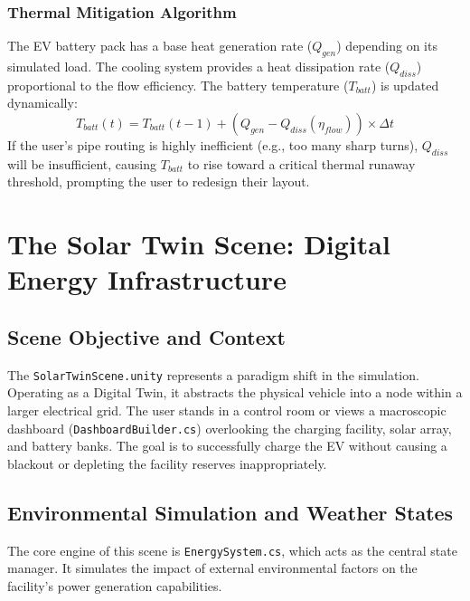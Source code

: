 \documentclass[12pt,a4paper,oneside]{report}
\begin{document}
\subsection{Thermal Mitigation Algorithm}
The EV battery pack has a base heat generation rate ($Q_{gen}$) depending on its simulated load. The cooling system provides a heat dissipation rate ($Q_{diss}$) proportional to the flow efficiency. 
The battery temperature ($T_{batt}$) is updated dynamically:
\begin{equation}
    T_{batt}(t) = T_{batt}(t-1) + \left( Q_{gen} - Q_{diss}(\eta_{flow}) \right) \times \Delta t
\end{equation}
If the user's pipe routing is highly inefficient (e.g., too many sharp turns), $Q_{diss}$ will be insufficient, causing $T_{batt}$ to rise toward a critical thermal runaway threshold, prompting the user to redesign their layout.

\chapter{The Solar Twin Scene: Digital Energy Infrastructure}

\section{Scene Objective and Context}
The \texttt{SolarTwinScene.unity} represents a paradigm shift in the simulation. Operating as a Digital Twin, it abstracts the physical vehicle into a node within a larger electrical grid. The user stands in a control room or views a macroscopic dashboard (\texttt{DashboardBuilder.cs}) overlooking the charging facility, solar array, and battery banks. The goal is to successfully charge the EV without causing a blackout or depleting the facility reserves inappropriately.

\section{Environmental Simulation and Weather States}
The core engine of this scene is \texttt{EnergySystem.cs}, which acts as the central state manager. It simulates the impact of external environmental factors on the facility's power generation capabilities.
\end{document}
